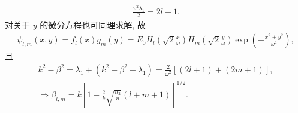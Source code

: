 \documentclass{note}
\begin{document}
\begin{pf}
    \begin{align}
        \frac{\omega^2\lambda_1}{2}=2l+1.
    \end{align}
    对关于 $y$ 的微分方程也可同理求解, 故
    \begin{align}
        \psi_{l,m}(x,y)=f_l(x)g_m(y)=E_0H_l\left(\sqrt{2}\frac{x}{\omega}\right)H_m\left(\sqrt{2}\frac{y}{\omega}\right)\exp\left(-\frac{x^2+y^2}{\omega^2}\right),
    \end{align}
    且
    \begin{gather}
        k^2-\beta^2=\lambda_1+(k^2-\beta^2-\lambda_1)=\frac{2}{\omega^2}[(2l+1)+(2m+1)],\\
        \Longrightarrow\beta_{l,m}=k\left[1-\frac{2}{k}\sqrt{\frac{n_2}{n}}(l+m+1)\right]^{1/2}.
    \end{gather}
\end{pf}
\ifx\allfiles\undefined
\end{document}
